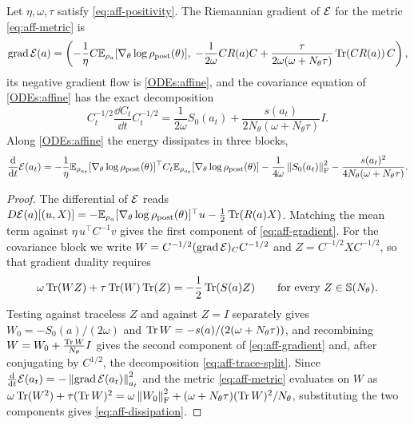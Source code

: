 \begin{theorem}\label{thm:aff-flow}
    Let $\eta, \omega, \tau$ satisfy \eqref{eq:aff-positivity}. The Riemannian gradient of $\mathcal{E}$ for the metric \eqref{eq:aff-metric} is
    \begin{equation}\label{eq:aff-gradient}
        \operatorname{grad} \mathcal{E} (a) = \left( -\frac{1}{\eta} C \mathbb{E}_{\rho_a} [\nabla_\theta \log \rho_{\mathrm{post}}(\theta)], \; -\frac{1}{2\omega} C R(a) C + \frac{\tau}{2\omega(\omega + N_\theta \tau)} \operatorname{Tr}(C R(a)) \, C \right),
    \end{equation}
    its negative gradient flow is \eqref{ODEs:affine}, and the covariance equation of \eqref{ODEs:affine} has the exact decomposition
    \begin{equation}\label{eq:aff-trace-split}
        C_t^{-1/2} \frac{\dd C_t}{\dd t} C_t^{-1/2} = \frac{1}{2\omega} S_0(a_t) + \frac{s(a_t)}{2 N_\theta (\omega + N_\theta \tau)} I.
    \end{equation}
    Along \eqref{ODEs:affine} the energy dissipates in three blocks,
    \begin{equation}\label{eq:aff-dissipation}
        \frac{\mathrm{d}}{\mathrm{d} t} \mathcal{E} (a_t) = -\frac{1}{\eta} \mathbb{E}_{\rho_{a_t}} [\nabla_\theta \log \rho_{\mathrm{post}}(\theta)]^\top C_t \mathbb{E}_{\rho_{a_t}} [\nabla_\theta \log \rho_{\mathrm{post}}(\theta)] - \frac{1}{4\omega} \left\lVert S_0(a_t)\right\rVert_{\mathrm{F}}^2 - \frac{s(a_t)^2}{4 N_\theta (\omega + N_\theta \tau)}.
    \end{equation}
\end{theorem}

\begin{proof}
    The differential of $\mathcal{E}$ reads $D\mathcal{E}(a)[(u,X)] = -\mathbb{E}_{\rho_a} [\nabla_\theta \log \rho_{\mathrm{post}}(\theta)]^\top u - \frac{1}{2} \operatorname{Tr}(R(a) X)$. Matching the mean term against $\eta \, u^\top C^{-1} v$ gives the first component of \eqref{eq:aff-gradient}. For the covariance block we write $W = C^{-1/2} (\operatorname{grad} \mathcal{E})_C C^{-1/2}$ and $Z = C^{-1/2} X C^{-1/2}$, so that gradient duality requires
    \begin{equation*}
        \omega \operatorname{Tr} (WZ) + \tau \operatorname{Tr}(W) \operatorname{Tr}(Z) = -\frac{1}{2} \operatorname{Tr} (S(a) Z) \qquad \text{for every } Z \in \mathbb{S}(N_\theta).
    \end{equation*}
    Testing against traceless $Z$ and against $Z = I$ separately gives $W_0 = -S_0(a)/(2\omega)$ and $\operatorname{Tr} W = -s(a)/(2(\omega + N_\theta\tau))$, and recombining $W = W_0 + \frac{\operatorname{Tr} W}{N_\theta} I$ gives the second component of \eqref{eq:aff-gradient} and, after conjugating by $C^{1/2}$, the decomposition \eqref{eq:aff-trace-split}. Since $\frac{\mathrm{d}}{\mathrm{d} t} \mathcal{E}(a_t) = -\left\lVert \operatorname{grad} \mathcal{E}(a_t)\right\rVert_{a_t}^2$ and the metric \eqref{eq:aff-metric} evaluates on $W$ as $\omega \operatorname{Tr}(W^2) + \tau (\operatorname{Tr} W)^2 = \omega \left\lVert W_0\right\rVert_{\mathrm{F}}^2 + (\omega + N_\theta \tau) (\operatorname{Tr} W)^2 / N_\theta$, substituting the two components gives \eqref{eq:aff-dissipation}.
\end{proof}

